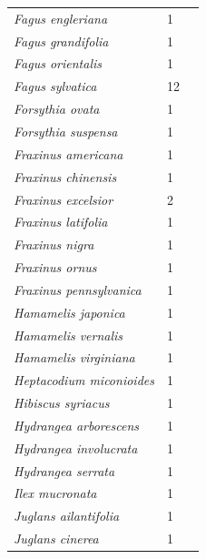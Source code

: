 \documentclass[11pt]{article}
\begin{document}
\begin{longtable}{p{}p{}p{}}
  \emph{Fagus engleriana} &   1 & \emph{\citep{zohner2016}} \\ 
  \emph{Fagus grandifolia} &   1 & \emph{\citep{flynn2018}} \\ 
  \emph{Fagus orientalis} &   1 & \emph{\citep{zohner2016}} \\ 
  \emph{Fagus sylvatica} &  12 & \emph{\citep{Basler:2012,Basler:2014aa,Caffarra:2011a,Falusi:1990aa,Falusi:1996aa,Falusi:1997aa,Falusi:2003aa,Heide:1993a,Laube:2014a,malyshev2018,vitra17,zohner2016}} \\ 
  \emph{Forsythia ovata} &   1 & \emph{\citep{zohner2016}} \\ 
  \emph{Forsythia suspensa} &   1 & \emph{\citep{zohner2016}} \\ 
  \emph{Fraxinus americana} &   1 & \emph{\citep{Webb:1977}} \\ 
  \emph{Fraxinus chinensis} &   1 & \emph{\citep{Laube:2014a}} \\ 
  \emph{Fraxinus excelsior} &   2 & \emph{\citep{Basler:2012,Laube:2014a}} \\ 
  \emph{Fraxinus latifolia} &   1 & \emph{\citep{zohner2016}} \\ 
  \emph{Fraxinus nigra} &   1 & \emph{\citep{flynn2018}} \\ 
  \emph{Fraxinus ornus} &   1 & \emph{\citep{zohner2016}} \\ 
  \emph{Fraxinus pennsylvanica} &   1 & \emph{\citep{Laube:2014a}} \\ 
  \emph{Hamamelis japonica} &   1 & \emph{\citep{zohner2016}} \\ 
  \emph{Hamamelis vernalis} &   1 & \emph{\citep{zohner2016}} \\ 
  \emph{Hamamelis virginiana} &   1 & \emph{\citep{flynn2018}} \\ 
  \emph{Heptacodium miconioides} &   1 & \emph{\citep{zohner2016}} \\ 
  \emph{Hibiscus syriacus} &   1 & \emph{\citep{zohner2016}} \\ 
  \emph{Hydrangea arborescens} &   1 & \emph{\citep{zohner2016}} \\ 
  \emph{Hydrangea involucrata} &   1 & \emph{\citep{zohner2016}} \\ 
  \emph{Hydrangea serrata} &   1 & \emph{\citep{zohner2016}} \\ 
  \emph{Ilex mucronata} &   1 & \emph{\citep{flynn2018}} \\ 
  \emph{Juglans ailantifolia} &   1 & \emph{\citep{Laube:2014a}} \\ 
  \emph{Juglans cinerea} &   1 & \emph{\citep{Laube:2014a}} \\ 

\end{longtable}
\end{document}
